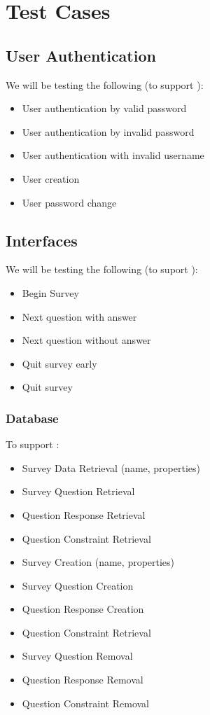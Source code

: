\documentclass[10pt]{article}
\begin{document}
\section{Test Cases}

\subsection{User Authentication}

We will be testing the following (to support ):

\begin{itemize}
\item User authentication by valid password
\item User authentication by invalid password
\item User authentication with invalid username
\item User creation
\item User password change
\end{itemize}

\subsection{Interfaces}

We will be testing the following (to suport \docsec{}):

\begin{itemize}
\item Begin Survey
\item Next question with answer
\item Next question without answer
\item Quit survey early
\item Quit survey
\end{itemize}

\subsubsection{Database}

To support :

\begin{itemize}
\item Survey Data Retrieval (name, properties)
\item Survey Question Retrieval
\item Question Response Retrieval
\item Question Constraint Retrieval
\item Survey Creation (name, properties)
\item Survey Question Creation
\item Question Response Creation
\item Question Constraint Retrieval
\item Survey Question Removal
\item Question Response Removal
\item Question Constraint Removal
\end{itemize}
\end{document}
